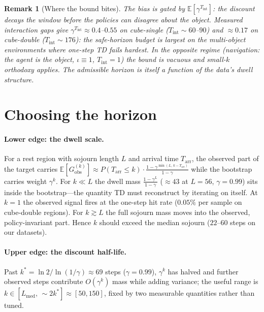 \documentclass{article}
\newtheorem{remark}{Remark}
\providecommand{\E}{\mathbb{E}}
\begin{document}
\begin{remark}[Where the bound bites]
The bias is gated by \(\E[\gamma^{T_{\mathrm{int}}}]\): the discount decays the
window before the policies can disagree about the object. Measured interaction
gaps give \(\gamma^{T_{\mathrm{int}}}\!\approx\!0.4\)--\(0.55\) on cube-single
(\(T_{\mathrm{int}}\!\sim\!60\)--\(90\)) and \(\approx\!0.17\) on cube-double
(\(T_{\mathrm{int}}\!\sim\!176\)): the safe-horizon budget is \emph{largest} on
the multi-object environments where one-step TD fails hardest. In the opposite
regime (navigation: the agent is the object, \(\iota\equiv1\),
\(T_{\mathrm{int}}=1\)) the bound is vacuous and small-\(k\) orthodoxy applies.
The admissible horizon is itself a function of the data's dwell structure.
\end{remark}

\section{Choosing the horizon}

\paragraph{Lower edge: the dwell scale.}
For a rest region with sojourn length \(L\) and arrival time
\(T_{\mathrm{arr}}\), the observed part of the target carries
\(\E[G^{(k)}_{\mathrm{obs}}]\approx
P(T_{\mathrm{arr}}\!\le\!k)\cdot\frac{1-\gamma^{\min(L,\,k-T_{\mathrm{arr}})}}{1-\gamma}\)
while the bootstrap carries weight \(\gamma^{k}\). For \(k\ll L\) the dwell
mass \(\frac{1-\gamma^{L}}{1-\gamma}\) (\(\approx\!43\) at \(L{=}56\),
\(\gamma{=}0.99\)) sits inside the bootstrap---the quantity TD must
reconstruct by iterating on itself. At \(k{=}1\) the observed signal fires at
the one-step hit rate (\(0.05\%\) per sample on cube-double regions). For
\(k\gtrsim L\) the full sojourn mass moves into the observed, policy-invariant
part. Hence \(k\) should exceed the median sojourn (\(22\)--\(60\) steps on our
datasets).

\paragraph{Upper edge: the discount half-life.}
Past \(k^\ast=\ln 2/\ln(1/\gamma)\approx 69\) steps (\(\gamma{=}0.99\)),
\(\gamma^{k}\) has halved and further observed steps contribute
\(O(\gamma^{k})\) mass while adding variance; the useful range is
\(k\in[L_{\mathrm{med}},\,\sim\!2k^\ast]\approx[50,150]\), fixed by two
measurable quantities rather than tuned.
\end{document}
